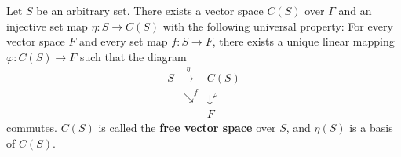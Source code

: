 Let $S$ be an arbitrary set. There exists a vector space $C(S)$ over $\Gamma$ and an injective set map $\eta: S \to C(S)$ with the following universal property: For every vector space $F$ and every set map $f: S \to F$, there exists a unique linear mapping $\varphi: C(S) \to F$ such that the diagram
$$\begin{array}{ccc}
S & \xrightarrow{\eta} & C(S) \\
& \searrow^f & \downarrow^\varphi \\
& & F
\end{array}$$
commutes. $C(S)$ is called the \textbf{free vector space} over $S$, and $\eta(S)$ is a basis of $C(S)$.
